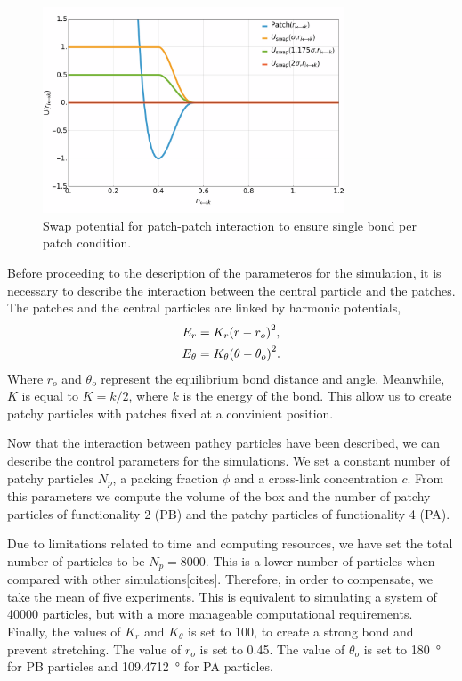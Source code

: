 \begin{figure}[ht!]
    \centering
    \includegraphics[width=0.8\textwidth]{figs/numerical/swapPotential.png}
    \caption{Swap potential for patch-patch interaction to ensure single bond per patch condition.}\label{fig:swappot}
\end{figure}

Before proceeding to the description of the parameteros for the simulation, it is necessary to describe the interaction between the central particle and the patches.
The patches and the central particles are linked by harmonic potentials,
\begin{align}
    E_r &= K_r\qty(r-r_{o})^2, \\
    E_\theta &= K_\theta\qty(\theta-\theta_{o})^2.
\end{align}
Where $r_o$ and $\theta_o$ represent the equilibrium bond distance and angle.
Meanwhile, $K$ is equal to $K=k/2$, where $k$ is the energy of the bond.
This allow us to create patchy particles with patches fixed at a convinient position.


Now that the interaction between pathcy particles have been described, we can describe the control parameters for the simulations.
We set a constant number of patchy particles $N_p$, a packing fraction $\phi$ and a cross-link concentration $c$. 
From this parameters we compute the volume of the box and the number of patchy particles of functionality 2 (PB) and the patchy particles of functionality 4 (PA).

Due to limitations related to time and computing resources, we have set the total number of particles to be $N_p=\num{8000}$.
This is a lower number of particles when compared with other simulations[cites].
Therefore, in order to compensate, we take the mean of five experiments.
This is equivalent to simulating a system of \num{40000} particles, but with a more manageable computational requirements.
Finally, the values of $K_r$ and $K_\theta$ is set to \num{100}, to create a strong bond and prevent stretching.
The value of $r_o$ is set to \num{0.45}.
The value of $\theta_o$ is set to \SI{180}{\degree} for PB particles and \SI{109.4712}{\degree} for PA particles.


